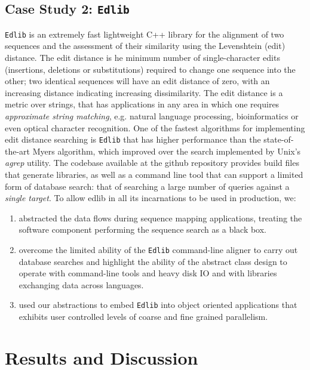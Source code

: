 \documentclass[10pt]{article}
\begin{document}
\subsection{Case Study 2: \texttt{Edlib}}
\texttt{Edlib}\cite{sosic_edlib_2017} is an extremely fast lightweight C++ library for the alignment of two sequences and the assessment of their similarity using the Levenshtein (edit) distance\cite{berger_levenshtein_2021}. The edit distance is he minimum number of single-character edits (insertions, deletions or substitutions) required to change one sequence into the other; two identical sequences will have an edit distance of zero, with an increasing distance indicating increasing dissimilarity. The edit distance is a metric over strings, that has applications in any area in which one requires \textit{approximate string matching}, e.g. natural language processing, bioinformatics or even optical character recognition. One of the fastest algorithms for implementing edit distance searching is \texttt{Edlib} that has higher performance than the state-of-the-art Myers\cite{myers_fast_1999} algorithm, which improved over the search implemented by Unix's \textit{agrep} utility.  The codebase available at the github repository provides build files that generate libraries, as well as a command line tool that can support a limited form of database search: that of searching a large number of queries against a \textit{single target}. To allow edlib in all its incarnations to be used in production, we:
\begin{enumerate}
\item abstracted the data flows during sequence mapping applications, treating the software component performing the sequence search as a black box. 
\item overcome the limited ability of the \texttt{Edlib} command-line aligner to carry out database searches and highlight the ability of the abstract class design to operate with command-line tools and heavy disk IO and with libraries exchanging data across languages.
\item used our abstractions to embed \texttt{Edlib} into object oriented applications that exhibits user controlled levels of coarse and fine grained parallelism. 
\end{enumerate}
\newpage

\section{Results and Discussion}
\end{document}
